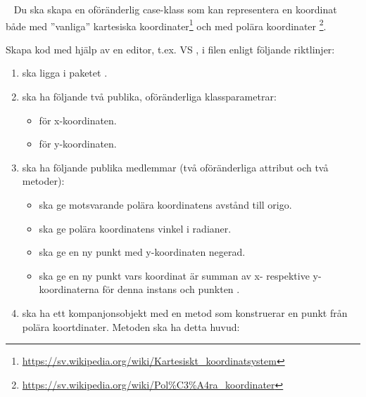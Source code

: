 \QUESTEND




\QUESTBEGIN

\Task \what~
Du ska skapa en oföränderlig case-klass  som kan representera en koordinat både med ''vanliga'' kartesiska koordinater\footnote{\url{https://sv.wikipedia.org/wiki/Kartesiskt_koordinatsystem}} och med polära koordinater%
\footnote{\url{https://sv.wikipedia.org/wiki/Pol\%C3\%A4ra\_koordinater}}.

\Subtask Skapa kod med hjälp av en editor, t.ex. VS , i filen   enligt följande riktlinjer:
\begin{enumerate}[noitemsep]
\item {} ska ligga i paketet .

\item {} ska ha följande två publika, oföränderliga klassparametrar:
\begin{itemize}[nolistsep, noitemsep]
\item {} för x-koordinaten.
\item {} för y-koordinaten.
\end{itemize}

\item {} ska ha följande publika medlemmar (två oföränderliga attribut och två metoder):
\begin{itemize}[nolistsep, noitemsep]
\item {} ska ge motsvarande polära koordinatens
 avstånd till origo.
\item {} ska ge polära koordinatens vinkel i radianer.
\item {} ska ge en ny punkt med y-koordinaten negerad.
\item {} ska ge en ny punkt vars koordinat är summan av x- respektive y-koordinaterna för denna instans och punkten .
\end{itemize}

\item {} ska ha ett kompanjonsobjekt med en metod som konstruerar en punkt från polära koortdinater. Metoden ska ha detta huvud: \\

\end{enumerate}

